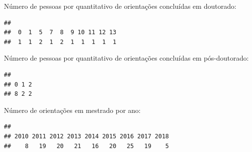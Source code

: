 \documentclass[]{article}
\newenvironment{Shaded}{\begin{snugshade}}{\end{snugshade}}
\newcommand{\ControlFlowTok}[1]{\textcolor[rgb]{0.13,0.29,0.53}{\textbf{#1}}}
\newcommand{\KeywordTok}[1]{\textcolor[rgb]{0.13,0.29,0.53}{\textbf{#1}}}
\newcommand{\NormalTok}[1]{#1}
\newcommand{\OperatorTok}[1]{\textcolor[rgb]{0.81,0.36,0.00}{\textbf{#1}}}
\begin{document}
Número de pessoas por quantitativo de orientações concluídas em
doutorado:

\begin{Shaded}
\end{Shaded}

\begin{verbatim}
## 
##  0  1  5  7  8  9 10 11 12 13 
##  1  1  2  1  2  1  1  1  1  1
\end{verbatim}

Número de pessoas por quantitativo de orientações concluídas em
pós-doutorado:

\begin{Shaded}
\end{Shaded}

\begin{verbatim}
## 
## 0 1 2 
## 8 2 2
\end{verbatim}

Número de orientações em mestrado por ano:

\begin{Shaded}
\end{Shaded}

\begin{verbatim}
## 
## 2010 2011 2012 2013 2014 2015 2016 2017 2018 
##    8   19   20   21   16   20   25   19    5
\end{verbatim}
\end{document}
